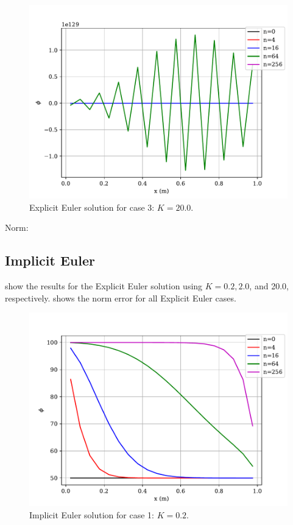 \documentclass[12pt]{article}
\begin{document}
\begin{figure}[htbp]
    \centering
    \includegraphics[width=\textwidth]{plots/graph_EE_case3.pdf}
    \caption{Explicit Euler solution for case 3: $K=20.0$.}
    \label{fig:ee3}
\end{figure}

Norm:



\clearpage
\subsection{Implicit Euler}
 show the results for the Explicit Euler solution using $K=0.2,2.0$, and 20.0, respectively.  shows the norm error for all Explicit Euler cases.
\begin{figure}[htbp]
    \centering
    \includegraphics[width=\textwidth]{plots/graph_IE_case1.pdf}
    \caption{Implicit Euler solution for case 1: $K=0.2$.}
    \label{fig:ie1}
\end{figure}
\end{document}
